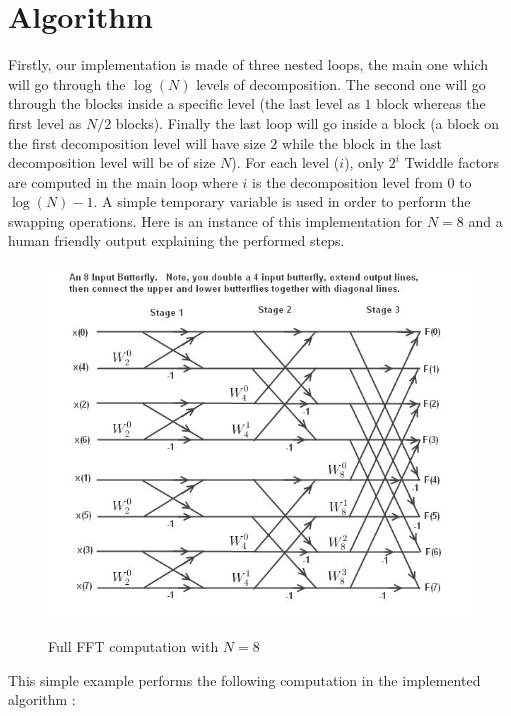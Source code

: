 \documentclass[a4paper]{report}
\begin{document}
\section{Algorithm}
Firstly, our implementation is made of three nested loops, the main one which will go through the $\log(N)$ levels of decomposition. The second one will go through the blocks inside a specific level (the last level as $1$ block whereas the first level as $N/2$ blocks). Finally the last loop will go inside a block (a block on the first decomposition level will have size $2$ while the block in the last decomposition level will be of size $N$). For each level ($i$), only $2^i$ Twiddle factors are computed in the main loop where $i$ is the decomposition level from $0$ to $\log(N)-1$. A simple temporary variable is used in order to perform the swapping operations. Here is an instance of this implementation for $N=8$ and a human friendly output explaining the performed steps.
\begin{figure}[H]
\begin{center}
\includegraphics[scale=0.7]{Butterfly8.jpg}\label{bb}
\caption{Full FFT computation with $N=8$ \cite{learnfft}}
\end{center}
\end{figure}
This simple example performs the following computation in the implemented algorithm :
\end{document}
